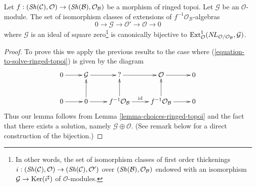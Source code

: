 \begin{lemma}
\label{lemma-extensions-of-relative-ringed-topoi}
Let $f : (\mathop{\mathit{Sh}}\nolimits(\mathcal{C}), \mathcal{O}) \to
(\mathop{\mathit{Sh}}\nolimits(\mathcal{B}), \mathcal{O}_\mathcal{B})$ be a morphism of
ringed topoi. Let $\mathcal{G}$ be an $\mathcal{O}$-module.
The set of isomorphism classes of extensions of
$f^{-1}\mathcal{O}_\mathcal{B}$-algebras
$$
0 \to \mathcal{G} \to \mathcal{O}' \to \mathcal{O} \to 0
$$
where $\mathcal{G}$ is an ideal of square zero\footnote{In other words,
the set of isomorphism classes of first order thickenings
$i : (\mathop{\mathit{Sh}}\nolimits(\mathcal{C}), \mathcal{O}) \to (\mathop{\mathit{Sh}}\nolimits(\mathcal{C}), \mathcal{O}')$
over $(\mathop{\mathit{Sh}}\nolimits(\mathcal{B}), \mathcal{O}_\mathcal{B})$ endowed with an isomorphism
$\mathcal{G} \to \mathop{\mathrm{Ker}}(i^\sharp)$ of $\mathcal{O}$-modules.} 
is canonically bijective to
$\mathop{\mathrm{Ext}}\nolimits^1_\mathcal{O}(\mathop{N\!L}\nolimits_{\mathcal{O}/\mathcal{O}_\mathcal{B}}, \mathcal{G})$.
\end{lemma}

\begin{proof}
To prove this we apply the previous results to the case where
(\ref{equation-to-solve-ringed-topoi}) is given by the diagram
$$
\xymatrix{
0 \ar[r] &
\mathcal{G} \ar[r] &
{?} \ar[r] &
\mathcal{O} \ar[r] & 0 \\
0 \ar[r] &
0 \ar[u] \ar[r] &
f^{-1}\mathcal{O}_\mathcal{B} \ar[u] \ar[r]^{\text{id}} &
f^{-1}\mathcal{O}_\mathcal{B} \ar[u] \ar[r] & 0
}
$$
Thus our lemma follows from Lemma \ref{lemma-choices-ringed-topoi}
and the fact that there exists a solution, namely
$\mathcal{G} \oplus \mathcal{O}$.
(See remark below for a direct construction of the bijection.)
\end{proof}


